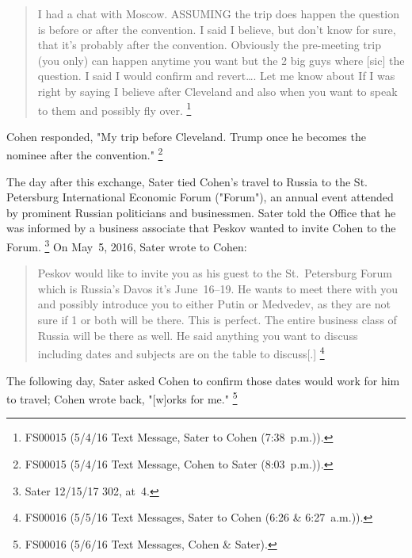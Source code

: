 \begin{quote}
I had a chat with Moscow.
ASSUMING the trip does happen the question is before or after the convention.
I said I believe, but don't know for sure, that it's probably after the convention.
Obviously the pre-meeting trip (you only) can happen anytime you want but the 2 big guys where [sic] the question.
I said I would confirm and revert\dots.
Let me know about If I was right by saying I believe after Cleveland and also when you want to speak to them and possibly fly over.%
\footnote{FS00015 (5/4/16 Text Message, Sater to Cohen (7:38~p.m.)).}
\end{quote}

Cohen responded, "My trip before Cleveland.
Trump once he becomes the nominee after the convention."%
\footnote{FS00015 (5/4/16 Text Message, Cohen to Sater (8:03~p.m.)).}

The day after this exchange, Sater tied Cohen's travel to Russia to the St. Petersburg International Economic Forum ("Forum"), an annual event attended by prominent Russian politicians and businessmen.
Sater told the Office that he was informed by a business associate that Peskov wanted to invite Cohen to the Forum.%
\footnote{Sater 12/15/17 302, at~4.}
On May~5, 2016, Sater wrote to Cohen:

\begin{quote}
Peskov would like to invite you as his guest to the St.~Petersburg Forum which is Russia's Davos it's June~16--19.
He wants to meet there with you and possibly introduce you to either Putin or Medvedev, as they are not sure if 1 or both will be there.
This is perfect.
The entire business class of Russia will be there as well.
He said anything you want to discuss including dates and subjects are on the table to discuss[.]%
\footnote{FS00016 (5/5/16 Text Messages, Sater to Cohen (6:26 \& 6:27~a.m.)).}
\end{quote}

The following day, Sater asked Cohen to confirm those dates would work for him to travel; Cohen wrote back, "[w]orks for me."%
\footnote{FS00016 (5/6/16 Text Messages, Cohen \& Sater).}

